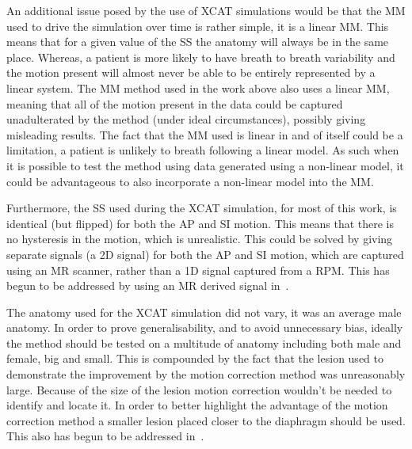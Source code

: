         An additional issue posed by the use of \gls{XCAT} simulations would be that the \gls{MM} used to drive the simulation over time is rather simple, it is a linear \gls{MM}. This means that for a given value of the \gls{SS} the anatomy will always be in the same place. Whereas, a patient is more likely to have breath to breath variability and the motion present will almost never be able to be entirely represented by a linear system. The \gls{MM} method used in the work above also uses a linear \gls{MM}, meaning that all of the motion present in the data could be captured unadulterated by the method (under ideal circumstances), possibly giving misleading results. The fact that the \gls{MM} used is linear in and of itself could be a limitation, a patient is unlikely to breath following a linear model. As such when it is possible to test the method using data generated using a non-linear model, it could be advantageous to also incorporate a non-linear model into the \gls{MM}.
        
        Furthermore, the \gls{SS} used during the \gls{XCAT} simulation, for most of this work, is identical (but flipped) for both the \gls{AP} and \gls{SI} motion. This means that there is no hysteresis in the motion, which is unrealistic. This could be solved by giving separate signals (a \gls{2D} signal) for both the \gls{AP} and \gls{SI} motion, which are captured using an \gls{MR} scanner, rather than a \gls{1D} signal captured from a \gls{RPM}. This has begun to be addressed by using an \gls{MR} derived signal in~.
        
        The anatomy used for the \gls{XCAT} simulation did not vary, it was an average male anatomy. In order to prove generalisability, and to avoid unnecessary bias, ideally the method should be tested on a multitude of anatomy including both male and female, big and small. This is compounded by the fact that the lesion used to demonstrate the improvement by the motion correction method was unreasonably large. Because of the size of the lesion motion correction wouldn't be needed to identify and locate it. In order to better highlight the advantage of the motion correction method a smaller lesion placed closer to the diaphragm should be used. This also has begun to be addressed in~.
        
